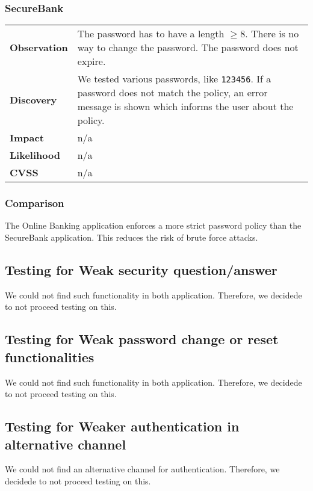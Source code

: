 \subsubsection*{SecureBank}

\begin{tabular}{l|p{10cm}}

\textbf{Observation} & The password has to have a length $\geq 8$. There is no way to change the password. The password does not expire. \\
\textbf{Discovery} &  We tested various passwords, like \texttt{123456}. If a password does not match the policy, an error message is shown which informs the user about the policy.  \\
\textbf{Impact} & n/a \\
\textbf{Likelihood} & n/a \\
\textbf{CVSS} & n/a \\
\end{tabular}

\subsubsection*{Comparison}
The Online Banking application enforces a more strict password policy than the SecureBank application. This reduces the risk of brute force attacks.

\clearpage

\subsection{Testing for Weak security question/answer}
We could not find such functionality in both application. Therefore, we decidede to not proceed testing on this.

\subsection{Testing for Weak password change or reset functionalities}
We could not find such functionality in both application. Therefore, we decidede to not proceed testing on this.

\subsection{Testing for Weaker authentication in alternative channel}
We could not find an alternative channel for authentication. Therefore, we decidede to not proceed testing on this.

